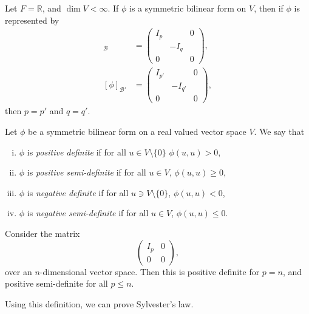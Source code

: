 \documentclass[12pt]{article}
\begin{document}
\begin{theorem}
	Let $F = \mathbb{R}$, and $\dim V < \infty$. If $\phi$ is a symmetric bilinear form on $V$, then if $\phi$ is represented by
	\begin{align*}
		[\phi]_{\mathcal{B}} &= 
		\begin{pmatrix}
			I_p & & 0 \\
			    & -I_q & \\
			0 & & 0
		\end{pmatrix}
		, \\
		[\phi]_{\mathcal{B}'} &=
		\begin{pmatrix}
			I_{p'} & & 0 \\
			       & -I_{q'} & \\
			0 & & 0
		\end{pmatrix},
	\end{align*}
	then $p = p'$ and $q = q'$.
\end{theorem}

\begin{definition}
	Let $\phi$ be a symmetric bilinear form on a real valued vector space $V$. We say that
	\begin{enumerate}[(i)]
		\item $\phi$ is \textit{positive definite} if for all $u \in V \setminus \{0\}$ $\phi(u, u) > 0$,
		\item $\phi$ is \textit{positive semi-definite} if for all $u \in V$, $\phi(u, u) \geq 0$,
		\item $\phi$ is \textit{negative definite} if for all $u \ni V \setminus \{0\}$, $\phi(u, u) < 0$,
		\item $\phi$ is \textit{negative semi-definite} if for all $u \in V$, $\phi(u, u) \leq 0$.
	\end{enumerate}
\end{definition}

\begin{exbox}
	Consider the matrix
	\[
	\begin{pmatrix}
		I_p & 0 \\
		0 & 0
	\end{pmatrix}
	,\]
	over an $n$-dimensional vector space. Then this is positive definite for $p = n$, and positive semi-definite for all $p \leq n$.
\end{exbox}

Using this definition, we can prove Sylvester's law.
\end{document}
